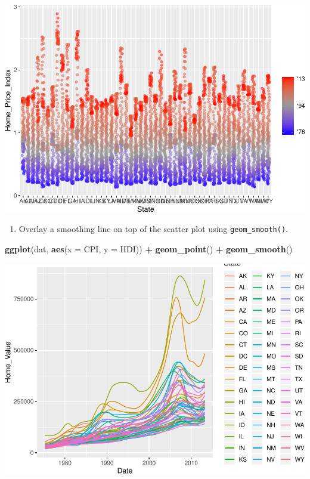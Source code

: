 \documentclass[]{book}
\newenvironment{Shaded}{\begin{snugshade}}{\end{snugshade}}
\newcommand{\DataTypeTok}[1]{\textcolor[rgb]{0.13,0.29,0.53}{#1}}
\newcommand{\KeywordTok}[1]{\textcolor[rgb]{0.13,0.29,0.53}{\textbf{#1}}}
\newcommand{\NormalTok}[1]{#1}
\newcommand{\OperatorTok}[1]{\textcolor[rgb]{0.81,0.36,0.00}{\textbf{#1}}}
\newcommand{\StringTok}[1]{\textcolor[rgb]{0.31,0.60,0.02}{#1}}
\providecommand{\tightlist}{%
  \setlength{\itemsep}{0pt}\setlength{\parskip}{0pt}}
\begin{document}
\includegraphics{R/Rgraphics/figures/unnamed-chunk-176-1.pdf}

\begin{enumerate}
\def\labelenumi{\arabic{enumi}.}
\setcounter{enumi}{1}
\tightlist
\item
  Overlay a smoothing line on top of the scatter plot using \texttt{geom\_smooth()}.
\end{enumerate}

\begin{Shaded}
\begin{Highlighting}[]
\KeywordTok{ggplot}\NormalTok{(dat, }\KeywordTok{aes}\NormalTok{(}\DataTypeTok{x =}\NormalTok{ CPI, }\DataTypeTok{y =}\NormalTok{ HDI)) }\OperatorTok{+}
\StringTok{  }\KeywordTok{geom_point}\NormalTok{() }\OperatorTok{+}
\StringTok{  }\KeywordTok{geom_smooth}\NormalTok{()}
\end{Highlighting}
\end{Shaded}

\includegraphics{R/Rgraphics/figures/unnamed-chunk-177-1.pdf}
\end{document}
